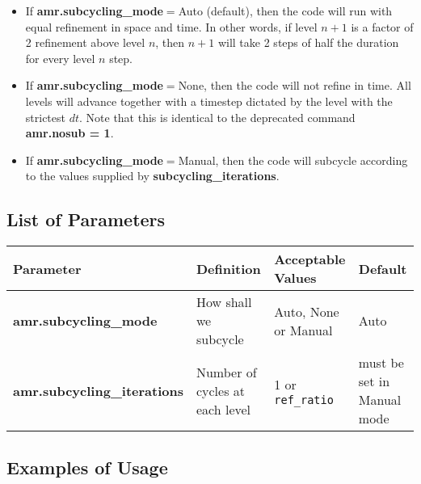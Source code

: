 \begin{itemize}
\item If {\bf amr.subcycling\_mode}$ = $Auto (default), then the code 
will run with equal refinement in space and time. In other words, if 
level $n+1$ is a factor of 2 refinement above level $n$, then $n+1$ 
will take 2 steps of half the duration for every level $n$ step.

\item If {\bf amr.subcycling\_mode}$ = $None, then the code 
will not refine in time. All levels will advance together with a 
timestep dictated by the level with the strictest $dt$. Note that this 
is identical to the deprecated command {\bf amr.nosub = 1}.

\item If {\bf amr.subcycling\_mode}$ = $Manual, then the code will 
subcycle according to the values supplied by {\bf 
subcycling\_iterations}.

\end{itemize}

\subsection{List of Parameters}

\begin{table*}[h]
\begin{scriptsize}
\begin{center}
\begin{tabular}{|l|l|l|l|} \hline
Parameter & Definition & Acceptable Values &Default\\
\hline
{\bf amr.subcycling\_mode}& How shall we subcycle &Auto, None or Manual & Auto \\ 
{\bf amr.subcycling\_iterations} & Number of cycles at each level & 1 
or {\tt ref\_ratio} & must be set in Manual mode \\ 
\hline
\end{tabular}
\end{center}
\end{scriptsize}
\end{table*}

\subsection{Examples of Usage}


